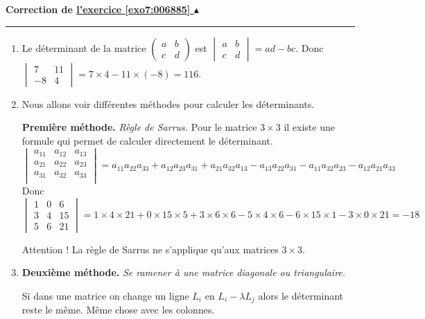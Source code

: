 \documentclass[11pt,a4paper]{article}
\newcounter{exo}
\newcommand{\correction}[1]{\hypertarget{cor7:#1}{}\label{cor7:#1}{\bf Correction de \hyperlink{exo7:#1}{l'exercice \ref{exo7:#1} $\blacktriangle$}}\vspace{1mm}\hrule\vspace{1mm}}
\begin{document}
\correction{006885}
\begin{enumerate}
  \item  Le déterminant de la matrice $\begin{pmatrix} a & b \\ c & d \end{pmatrix}$
est $\begin{vmatrix} a & b \\ c & d \end{vmatrix} =  ad-bc$.
Donc $\begin{vmatrix} 7 & 11 \\ -8 & 4 \end{vmatrix} = 7 \times 4 - 11 \times (-8) = 116$.

  \item Nous allons voir différentes méthodes pour calculer les déterminants.

\textbf{Première méthode.} \emph{Règle de Sarrus.} 
Pour le matrice $3\times 3$ il existe une formule qui permet de calculer directement le déterminant.
$$\begin{vmatrix} 
a_{11} & a_{12} & a_{13} \\   
a_{21} & a_{22} & a_{23} \\  
a_{31} & a_{32} & a_{33} \\ 
  \end{vmatrix}
= a_{11}a_{22}a_{33} + a_{12}a_{23}a_{31} + a_{21}a_{32}a_{13}
- a_{13}a_{22}a_{31} - a_{11} a_{32}a_{23}  - a_{12}a_{21}a_{33}$$
Donc 
$$\begin{vmatrix}
    1 & 0 & 6 \\
    3 & 4 & 15\\
    5 & 6 & 21
  \end{vmatrix}
= 1\times 4 \times 21 + 0 \times 15 \times 5 + 3\times 6 \times 6
- 5\times 4\times 6 -6\times 15 \times 1 -3 \times 0 \times 21 = -18$$


Attention ! La règle de Sarrus ne s'applique qu'aux matrices $3\times 3$.

  \item \textbf{Deuxième méthode.} \emph{Se ramener à une matrice diagonale ou triangulaire.}


Si dans une matrice on change un ligne $L_i$ en $L_i-\lambda L_j$ alors le déterminant reste le même.
Même chose avec les colonnes. 


\end{enumerate}
\end{document}
